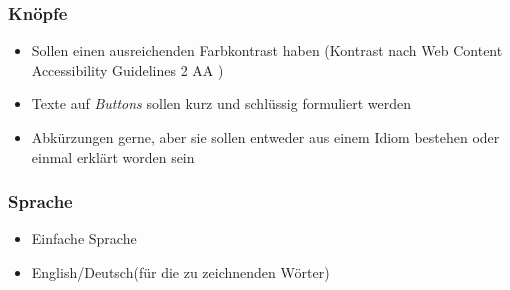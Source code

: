 \documentclass[11pt]{article}
\begin{document}
\subsubsection{Knöpfe}
\begin{itemize}
\item Sollen einen ausreichenden Farbkontrast haben (Kontrast nach Web Content Accessibility Guidelines 2 AA \parencite{Caldwell2008})
\item Texte auf \textit{Buttons} sollen kurz und schlüssig formuliert werden
\item Abkürzungen gerne, aber sie sollen entweder aus einem Idiom bestehen oder einmal erklärt worden sein
\end{itemize}

\subsubsection{Sprache}
\begin{itemize}
\item Einfache Sprache
\item English/Deutsch(für die zu zeichnenden Wörter)
\end{itemize}

\pagebreak
\printbibliography
\end{document}
